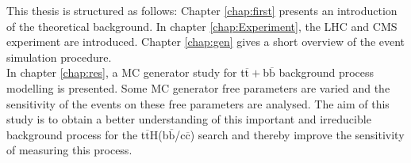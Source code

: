 \indent This thesis is structured as follows: Chapter \ref{chap:first} presents an introduction of the theoretical background. In chapter \ref{chap:Experiment}, the LHC and CMS experiment are introduced. Chapter \ref{chap:gen} gives a short overview of the event simulation procedure.\\
\indent In chapter \ref{chap:res}, a MC generator study for t$\overline{\text{t}}+$b$\overline{\text{b}}$ background process modelling is presented. Some MC generator free parameters are varied and the sensitivity of the events on these free parameters are analysed. The aim of this study is to obtain a better understanding of this important and irreducible background process for the t$\overline{\text{t}}$H(b$\overline{\text{b}}$/c$\overline{\text{c}}$) search and thereby improve the sensitivity of measuring this process.